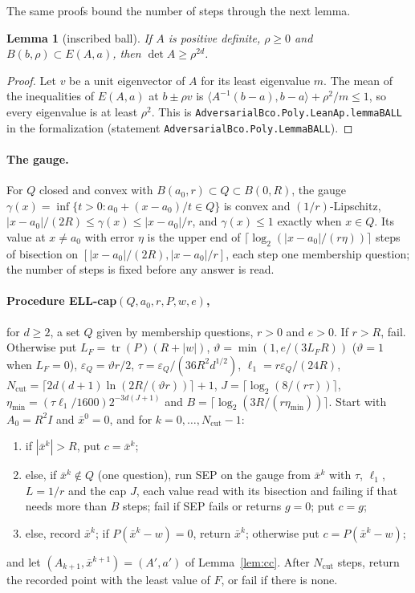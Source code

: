 \documentclass[11pt]{amsart}
\newtheorem{lemma}[theorem]{Lemma}
\theoremstyle{definition}
\numberwithin{equation}{section}
\newcommand{\tr}{\operatorname{tr}}
\newcommand{\ip}[1]{\langle #1\rangle}
\begin{document}
The same proofs bound the number of steps through the next lemma.

\begin{lemma}[inscribed ball]\label{lem:ball}
If $A$ is positive definite, $\rho\ge0$ and $B(b,\rho)\subset E(A,a)$, then $\det A\ge\rho^{2d}$.
\end{lemma}

\begin{proof}
Let $v$ be a unit eigenvector of $A$ for its least eigenvalue $m$. The mean of the inequalities of $E(A,a)$ at $b\pm\rho v$ is $\ip{A^{-1}(b-a),b-a}+\rho^2/m\le1$, so every eigenvalue is at least $\rho^2$.
This is \texttt{AdversarialBco.Poly.LeanAp.lemmaBALL} in the formalization (statement \texttt{AdversarialBco.Poly.LemmaBALL}).
\end{proof}

\paragraph{The gauge.} For $Q$ closed and convex with $B(a_0,r)\subset Q\subset B(0,R)$, the gauge $\gamma(x)=\inf\{t>0:a_0+(x-a_0)/t\in Q\}$ is convex and $(1/r)$-Lipschitz, $|x-a_0|/(2R)\le\gamma(x)\le|x-a_0|/r$, and $\gamma(x)\le1$ exactly when $x\in Q$. Its value at $x\ne a_0$ with error $\eta$ is the upper end of $\lceil\log_2(|x-a_0|/(r\eta))\rceil$ steps of bisection on $[|x-a_0|/(2R),|x-a_0|/r]$, each step one membership question; the number of steps is fixed before any answer is read.

\paragraph{Procedure ELL-cap$(Q,a_0,r,P,w,e)$,} for $d\ge2$, a set $Q$ given by membership questions, $r>0$ and $e>0$. If $r>R$, fail. Otherwise put $L_F=\tr(P)(R+|w|)$, $\vartheta=\min(1,e/(3L_FR))$ ($\vartheta=1$ when $L_F=0$), $\varepsilon_Q=\vartheta r/2$, $\tau=\varepsilon_Q/(36R^2d^{1/2})$, $\ell_1=r\varepsilon_Q/(24R)$, $N_{\mathrm{cut}}=\lceil2d(d+1)\ln(2R/(\vartheta r))\rceil+1$, $J=\lceil\log_2(8/(r\tau))\rceil$, $\eta_{\min}=(\tau\ell_1/1600)2^{-3d(J+1)}$ and $B=\lceil\log_2(3R/(r\eta_{\min}))\rceil$. Start with $A_0=R^2I$ and $\bar x^0=0$, and for $k=0,\dots,N_{\mathrm{cut}}-1$:
\begin{enumerate}[label=\arabic*.,leftmargin=2em]
\item if $|\bar x^k|>R$, put $c=\bar x^k$;
\item else, if $\bar x^k\notin Q$ (one question), run SEP on the gauge from $\bar x^k$ with $\tau$, $\ell_1$, $L=1/r$ and the cap $J$, each value read with its bisection and failing if that needs more than $B$ steps; fail if SEP fails or returns $g=0$; put $c=g$;
\item else, record $\bar x^k$; if $P(\bar x^k-w)=0$, return $\bar x^k$; otherwise put $c=P(\bar x^k-w)$;
\end{enumerate}
and let $(A_{k+1},\bar x^{k+1})=(A',a')$ of Lemma~\ref{lem:cc}. After $N_{\mathrm{cut}}$ steps, return the recorded point with the least value of $F$, or fail if there is none.
\end{document}
